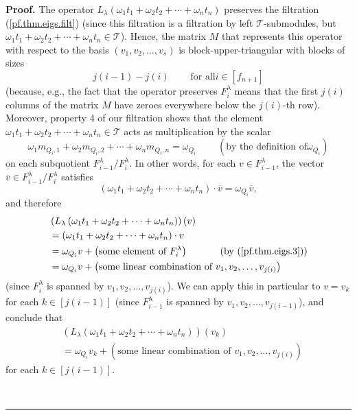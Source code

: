\documentclass[numbers=enddot,12pt,final,onecolumn,notitlepage]{scrartcl}%
\theoremstyle{definition}
\newenvironment{proof}[1][Proof]{\noindent\textbf{#1.} }{\ \rule{0.5em}{0.5em}}
\begin{document}
\begin{proof}
The operator $L_{\lambda}\left(  \omega_{1}t_{1}+\omega_{2}t_{2}+\cdots
+\omega_{n}t_{n}\right)  $ preserves the filtration (\ref{pf.thm.eigs.filt})
(since this filtration is a filtration by left $\mathcal{T}$-submodules, but
$\omega_{1}t_{1}+\omega_{2}t_{2}+\cdots+\omega_{n}t_{n}\in\mathcal{T}$).
Hence, the matrix $M$ that represents this operator with respect to the basis
$\left(  v_{1},v_{2},\ldots,v_{s}\right)  $ is block-upper-triangular with
blocks of sizes
\[
j\left(  i-1\right)  -j\left(  i\right)  \ \ \ \ \ \ \ \ \ \ \text{for all
}i\in\left[  f_{n+1}\right]
\]
(because, e.g., the fact that the operator preserves $F_{i}^{\lambda}$ means
that the first $j\left(  i\right)  $ columns of the matrix $M$ have zeroes
everywhere below the $j\left(  i\right)  $-th row). Moreover, property 4 of
our filtration shows that the element $\omega_{1}t_{1}+\omega_{2}t_{2}%
+\cdots+\omega_{n}t_{n}\in\mathcal{T}$ acts as multiplication by the scalar
\[
\omega_{1}m_{Q_{i},1}+\omega_{2}m_{Q_{i},2}+\cdots+\omega_{n}m_{Q_{i}%
,n}=\omega_{Q_{i}}\ \ \ \ \ \ \ \ \ \ \left(  \text{by the definition of
}\omega_{Q_{i}}\right)
\]
on each subquotient $F_{i-1}^{\lambda}/F_{i}^{\lambda}$. In other words, for
each $v\in F_{i-1}^{\lambda}$, the vector $\overline{v}\in F_{i-1}^{\lambda
}/F_{i}^{\lambda}$ satisfies%
\begin{equation}
\left(  \omega_{1}t_{1}+\omega_{2}t_{2}+\cdots+\omega_{n}t_{n}\right)
\cdot\overline{v}=\omega_{Q_{i}}\overline{v}, \label{pf.thm.eigs.3}%
\end{equation}
and therefore%
\begin{align*}
&  \left(  L_{\lambda}\left(  \omega_{1}t_{1}+\omega_{2}t_{2}+\cdots
+\omega_{n}t_{n}\right)  \right)  \left(  v\right) \\
&  =\left(  \omega_{1}t_{1}+\omega_{2}t_{2}+\cdots+\omega_{n}t_{n}\right)
\cdot v\\
&  =\omega_{Q_{i}}v+\left(  \text{some element of }F_{i}^{\lambda}\right)
\ \ \ \ \ \ \ \ \ \ \left(  \text{by (\ref{pf.thm.eigs.3})}\right) \\
&  =\omega_{Q_{i}}v+\left(  \text{some linear combination of }v_{1}%
,v_{2},\ldots,v_{j\left(  i\right)  }\right)
\end{align*}
(since $F_{i}^{\lambda}$ is spanned by $v_{1},v_{2},\ldots,v_{j\left(
i\right)  }$). We can apply this in particular to $v=v_{k}$ for each
$k\in\left[  j\left(  i-1\right)  \right]  $ (since $F_{i-1}^{\lambda}$ is
spanned by $v_{1},v_{2},\ldots,v_{j\left(  i-1\right)  }$), and conclude that%
\begin{align*}
&  \left(  L_{\lambda}\left(  \omega_{1}t_{1}+\omega_{2}t_{2}+\cdots
+\omega_{n}t_{n}\right)  \right)  \left(  v_{k}\right) \\
&  =\omega_{Q_{i}}v_{k}+\left(  \text{some linear combination of }v_{1}%
,v_{2},\ldots,v_{j\left(  i\right)  }\right)
\end{align*}
for each $k\in\left[  j\left(  i-1\right)  \right]  $.


\end{proof}
\end{document}
